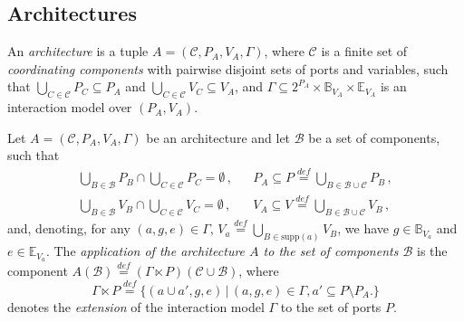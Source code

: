 \documentclass{llncs}
\newcommand{\cB}{\ensuremath{\mathcal{B}}}
\newcommand{\sB}{\ensuremath{\mathbb{B}}}
\newcommand{\cC}{\ensuremath{\mathcal{C}}}
\newcommand{\sE}{\ensuremath{\mathbb{E}}}
\newcommand{\bydef}[1]{\ensuremath{\stackrel{\mathit{\scriptscriptstyle def}}{#1}}}
\newcommand{\setdefb}[2]{\ensuremath{\bigl\{{#1}\,\bigl|\,{#2}\bigr.\bigr\}}}
\newcommand{\guards}[1]{\ensuremath{\sB_{#1}}}
\newcommand{\exprs}[1]{\ensuremath{\sE_{#1}}}
\newcommand{\supp}[1]{\ensuremath{\mathrm{supp}(#1)}}
\newcommand{\IMextend}[2]{\ensuremath{#1 \ltimes #2}}
\begin{document}
\subsection{Architectures}
\label{secn:archi}

\begin{definition}[Architecture]
  \label{defn:arch}
  An \emph{architecture} is a tuple $A = (\cC, P_A, V_A, \Gamma)$,
  where $\cC$ is a finite set of \emph{coordinating components}
  with pairwise disjoint sets of ports and variables, such that
  $\bigcup_{C \in \cC} P_C \subseteq P_A$ and
  $\bigcup_{C \in \cC} V_C \subseteq V_A$, and
  $\Gamma \subseteq 2^{P_A} \times \guards{V_A} \times \exprs{V_A}$
  is an interaction model over $(P_A, V_A)$.
\end{definition}

\begin{definition}
  \label{defn:arch:application}
  Let $A = (\cC, P_A, V_A, \Gamma)$ be an architecture and let $\cB$
  be a set of components, such that
%
  \begin{align}
    \bigcup_{B \in \cB} P_B \cap \bigcup_{C \in \cC} P_C = \emptyset\,,
    &&
    P_A \subseteq P \bydef{=} \bigcup_{B \in \cB \cup \cC} P_B\,,
    \\
    \bigcup_{B \in \cB} V_B \cap \bigcup_{C \in \cC} V_C = \emptyset\,,
    &&
    V_A \subseteq V \bydef{=} \bigcup_{B \in \cB \cup \cC} V_B\,,
  \end{align}
%
  and, denoting, for any $(a, g, e) \in \Gamma$, $V_a \bydef{=}
  \bigcup_{B \in \supp{a}} V_B$, we have $g \in \guards{V_a}$ and
  $e \in \exprs{V_a}$.
%
  The \emph{application of the architecture $A$ to the set of
  components $\cB$} is the component $ A(\cB) \bydef{=}
  (\IMextend{\Gamma}{P})(\cC \cup \cB)$, where
%
  \begin{equation}
    \label{eq:im:extension}
    \IMextend{\Gamma}{P} \bydef{=}
    \setdefb{
      (a \cup a', g, e)
    }{
      (a, g, e) \in \Gamma, a' \subseteq P \setminus P_A
    }
  \end{equation}
%
  denotes the \emph{extension} of the interaction model $\Gamma$
  to the set of ports $P$.
\end{definition}
\end{document}
